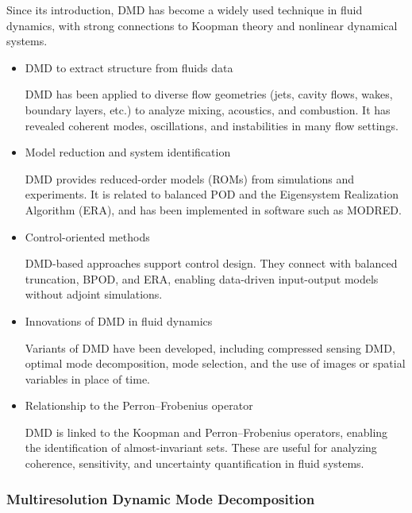 \documentclass{article}
\begin{document}
\vspace{1cm}

Since its introduction, DMD has become a widely used technique in fluid dynamics,
with strong connections to Koopman theory and nonlinear dynamical systems.

\begin{itemize}
    \item DMD to extract structure from fluids data
    
DMD has been applied to diverse flow geometries (jets, cavity flows, wakes,
boundary layers, etc.) to analyze mixing, acoustics, and combustion. 
It has revealed coherent modes, oscillations, and instabilities in many flow settings.

    \item Model reduction and system identification
    
DMD provides reduced-order models (ROMs) from simulations and experiments.
It is related to balanced POD and the Eigensystem Realization Algorithm (ERA),
and has been implemented in software such as MODRED.

    \item Control-oriented methods
    
DMD-based approaches support control design. They connect with balanced
truncation, BPOD, and ERA, enabling data-driven input-output models without
adjoint simulations.

    \item Innovations of DMD in fluid dynamics
    
Variants of DMD have been developed, including compressed sensing DMD,
optimal mode decomposition, mode selection, and the use of images or spatial
variables in place of time.

    \item Relationship to the Perron--Frobenius operator
    
DMD is linked to the Koopman and Perron--Frobenius operators, enabling the
identification of almost-invariant sets. These are useful for analyzing coherence,
sensitivity, and uncertainty quantification in fluid systems.
\end{itemize}

\vspace{1cm}

\subsubsection*{Multiresolution Dynamic Mode Decomposition}
\end{document}
